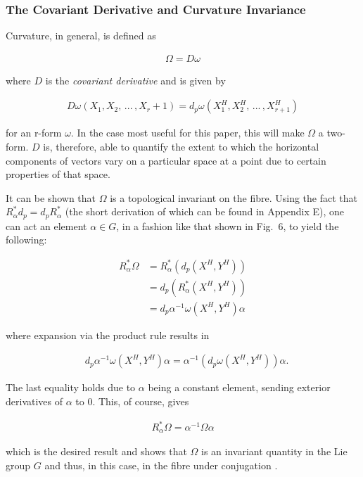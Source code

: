 \documentclass[fleqn, twocolumn, 10pt]{article}
\begin{document}
\subsubsection{The Covariant Derivative and Curvature Invariance}

Curvature, in general, is defined as 

\begin{ceqn}
\begin{align*}
\Omega = D\omega
\end{align*}
\end{ceqn}
where $D$ is the \textit{covariant derivative} and is given by 

\begin{ceqn}
\begin{align*}
D\omega(X_1, X_2,\,...\,, X_r+1) = d_p\omega(X^H_1, X^H_2,\,...\,, X^H_{r+1})
\end{align*}
\end{ceqn}
for an r-form $\omega$. In the case most useful for this paper, this will make $\Omega$ a two-form. $D$ is, therefore, able to quantify the extent to which the horizontal components of vectors vary on a particular space at a point due to certain properties of that space. 

It can be shown that $\Omega$ is a topological invariant on the fibre. Using the fact that $R^\ast_\alpha d_p = d_pR^\ast_\alpha$ (the short derivation of which can be found in Appendix E), one can act an element $\alpha \in G$, in a fashion like that shown in Fig.~6, to yield the following:

\begin{ceqn}
\begin{align*}
R^\ast_\alpha\Omega &= R^\ast_\alpha(d_p(X^H, Y^H))\\ &= d_p(R^\ast_\alpha(X^H, Y^H))\\ &= d_p\alpha^{-1}\omega(X^H, Y^H)\alpha 
\end{align*}
\end{ceqn}
where expansion via the product rule results in

\begin{ceqn}
\begin{align*}
&d_p\alpha^{-1}\omega(X^H, Y^H)\alpha = \alpha^{-1}(d_p\omega(X^H, Y^H))\alpha.
\end{align*}
\end{ceqn}
The last equality holds due to $\alpha$ being a constant element, sending exterior derivatives of $\alpha$ to $0$. This, of course, gives

\begin{ceqn}
\begin{align*}
R^\ast_\alpha\Omega = \alpha^{-1}\Omega\alpha
\end{align*}
\end{ceqn}
which is the desired result and shows that $\Omega$ is an invariant quantity in the Lie group $G$ and thus, in this case, in the fibre under conjugation \cite{nakahara2003geometry, kai2015lam, schuller2014geometric}.
\end{document}
